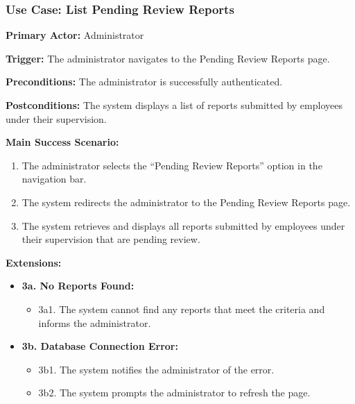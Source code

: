 \subsubsection{\textbf{Use Case: List Pending Review Reports}}

\textbf{Primary Actor:} Administrator

\textbf{Trigger:} The administrator navigates to the Pending Review Reports page.

\textbf{Preconditions:} The administrator is successfully authenticated.

\textbf{Postconditions:} The system displays a list of reports submitted by employees under their supervision.

\vspace{0.5cm}

\textbf{Main Success Scenario:}

\begin{enumerate} [leftmargin=0.75cm, noitemsep]
\item The administrator selects the ``Pending Review Reports'' option in the navigation bar.
\item The system redirects the administrator to the Pending Review Reports page.
\item The system retrieves and displays all reports submitted by employees under their supervision that are pending review.
\end{enumerate}

\vspace{0.3cm}

\textbf{Extensions:}

\begin{itemize} [label={}, leftmargin=0.75cm, noitemsep]

    \item \textbf{3a. No Reports Found:}
    \begin{itemize} [label={},leftmargin=0.75cm, noitemsep]
        \item 3a1. The system cannot find any reports that meet the criteria and informs the administrator.
    \end{itemize}

    \item \textbf{3b. Database Connection Error:}
    \begin{itemize} [label={},leftmargin=0.75cm, noitemsep]
        \item 3b1. The system notifies the administrator of the error.
        \item 3b2. The system prompts the administrator to refresh the page.
    \end{itemize}

\end{itemize}

\vspace{0.3cm}
